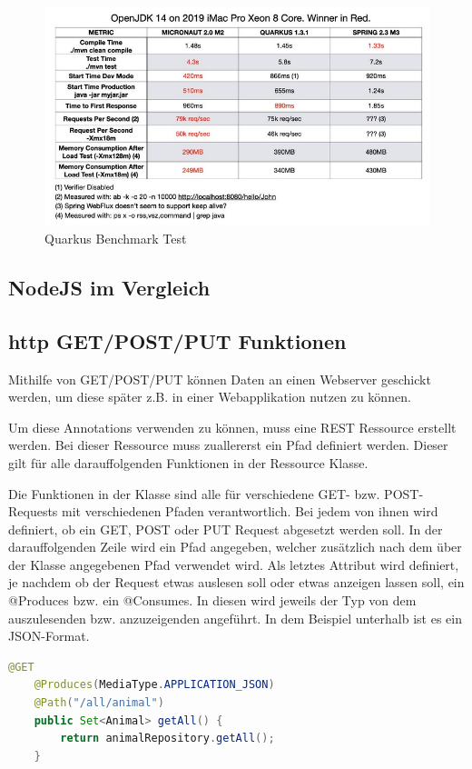 \begin{figure}
    \centering
    \includegraphics[scale=0.8]{pics/quarkus_benchmark.jpg}
    \caption{Quarkus Benchmark Test \cite{MicrVSQuarVSSprin}}
    \label{fig:impl:Quarkusbenchmark}
\end{figure}
 
\subsection{NodeJS im Vergleich}
\subsection{http GET/POST/PUT Funktionen}
Mithilfe von GET/POST/PUT können Daten an einen Webserver geschickt werden, um diese später z.B. in einer Webapplikation nutzen zu können.
 
Um diese Annotations verwenden zu können, muss eine REST Ressource erstellt werden.
Bei dieser Ressource muss zuallererst ein Pfad definiert werden. Dieser gilt für alle darauffolgenden Funktionen in der Ressource Klasse.
 
Die Funktionen in der Klasse sind alle für verschiedene GET- bzw. POST-Requests mit verschiedenen Pfaden verantwortlich. Bei jedem von ihnen wird definiert, ob ein GET, POST oder PUT Request abgesetzt werden soll. In der darauffolgenden Zeile wird ein Pfad angegeben, welcher zusätzlich nach dem über der Klasse angegebenen Pfad verwendet wird. Als letztes Attribut wird definiert, je nachdem ob der Request etwas auslesen soll oder etwas anzeigen lassen soll, ein @Produces bzw. ein @Consumes. In diesen wird jeweils der Typ von dem auszulesenden bzw. anzuzeigenden angeführt. In dem Beispiel unterhalb ist es ein JSON-Format. \cite{quarkusRest}
\begin{lstlisting}[language=java,caption=Quarkus POST-Request,label=lst:impl:canvasJSchartOptions]
    @GET
    @Produces(MediaType.APPLICATION_JSON)
    @Path("/all/animal")
    public Set<Animal> getAll() {
        return animalRepository.getAll();
    }
  \end{lstlisting}


